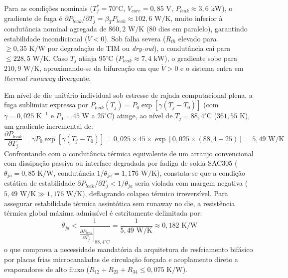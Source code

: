 Para as condições nominais ($T_j^* = 70^\circ\text{C}$, $V_{core} = 0{,}85\text{ V}$, $P_{leak} \approx 3{,}6\text{ kW}$), o gradiente de fuga é $\partial P_{leak}/\partial T_j = \beta_T P_{leak} \approx 102{,}6\text{ W/K}$, muito inferior à condutância nominal agregada de $860{,}2\text{ W/K}$ (80 dies em paralelo), garantindo estabilidade incondicional ($\dot{V} < 0$). Sob falha severa ($R_{th}$ elevado para $\ge 0{,}35\text{ K/W}$ por degradação de TIM ou \textit{dry-out}), a condutância cai para $\le 228{,}5\text{ W/K}$. Caso $T_j$ atinja $95^\circ\text{C}$ ($P_{leak} \approx 7{,}4\text{ kW}$), o gradiente sobe para $210{,}9\text{ W/K}$, aproximando-se da bifurcação em que $\dot{V} > 0$ e o sistema entra em \textit{thermal runaway} divergente.

Em nível de die unitário individual sob estresse de rajada computacional plena, a fuga sublimiar expressa por $P_{leak}(T_j) = P_0 \exp[\gamma(T_j - T_0)]$ (com $\gamma = 0{,}025\text{ K}^{-1}$ e $P_0 = 45\text{ W}$ a $25^\circ\text{C}$) atinge, ao nível de $T_j = 88{,}4^\circ\text{C}$ ($361{,}55\text{ K}$), um gradiente incremental de:
\begin{equation}
    \frac{\partial P_{leak}}{\partial T_j} = \gamma P_0 \exp\left[ \gamma(T_j - T_0) \right] = 0{,}025 \times 45 \times \exp\left[ 0{,}025 \times (88{,}4 - 25) \right] = 5{,}49\text{ W/K}
\end{equation}
Confrontando com a condutância térmica equivalente de um arranjo convencional com dissipação passiva ou interface degradada por fadiga de solda SAC305 ($\theta_{ja} = 0{,}85\text{ K/W}$, condutância $1/\theta_{ja} = 1{,}176\text{ W/K}$), constata-se que a condição estática de estabilidade $\partial P_{leak}/\partial T_j < 1/\theta_{ja}$ seria violada com margem negativa ($5{,}49\text{ W/K} \gg 1{,}176\text{ W/K}$), deflagrando colapso térmico irreversível. Para assegurar estabilidade térmica assintótica sem runaway no die, a resistência térmica global máxima admissível é estritamente delimitada por:
\begin{equation}
    \theta_{ja} < \frac{1}{\left.\frac{\partial P_{leak}}{\partial T_j}\right|_{88{,}4^\circ\text{C}}} = \frac{1}{5{,}49\text{ W/K}} \approx 0{,}182\text{ K/W}
\end{equation}
o que comprova a necessidade mandatória da arquitetura de resfriamento bifásico por placas frias microcanaladas de circulação forçada e acoplamento direto a evaporadores de alto fluxo ($R_{12}+R_{23}+R_{34} \le 0{,}075\text{ K/W}$).

